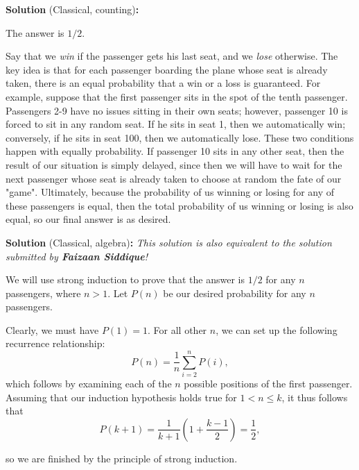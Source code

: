 
\begin{solution}
\textbf{Solution} (Classical, counting)\textbf{:}\V

The answer is $1/2$. \V

Say that we \textit{win} if the passenger gets his last seat, and we \textit{lose} otherwise. The key idea is that for each passenger boarding the plane whose seat is already taken, there is an equal probability that a win or a loss is guaranteed. For example, suppose that the first passenger sits in the spot of the tenth passenger. Passengers 2-9 have no issues sitting in their own seats; however, passenger 10 is forced to sit in any random seat. If he sits in seat 1, then we automatically win; conversely, if he sits in seat 100, then we automatically lose. These two conditions happen with equally probability. If passenger 10 sits in any other seat, then the result of our situation is simply delayed, since then we will have to wait for the next passenger whose seat is already taken to choose at random the fate of our "game". Ultimately, because the probability of us winning or losing for any of these passengers is equal, then the total probability of us winning or losing is also equal, so our final answer is as desired.
\end{solution}\V

\begin{solution}
\textbf{Solution} (Classical, algebra)\textbf{:}
\newline
\textit{This solution is also equivalent to the solution submitted by \textbf{Faizaan Siddique}!}\V

We will use strong induction to prove that the answer is $1/2$ for any $n$ passengers, where $n>1$. Let $P(n)$ be our desired probability for any $n$ passengers.\V

Clearly, we must have $P(1) = 1$. For all other $n$, we can set up the following recurrence relationship: 
\[P(n) = \frac{1}{n}\sum_{i=2}^{n}P(i),\]
which follows by examining each of the $n$ possible positions of the first passenger. Assuming that our induction hypothesis holds true for $1 < n \leq k$, it thus follows that
\[P(k+1) = \frac{1}{k+1}\left(1 + \frac{k-1}{2}\right) = \frac{1}{2},\]

so we are finished by the principle of strong induction.
\end{solution}\V
